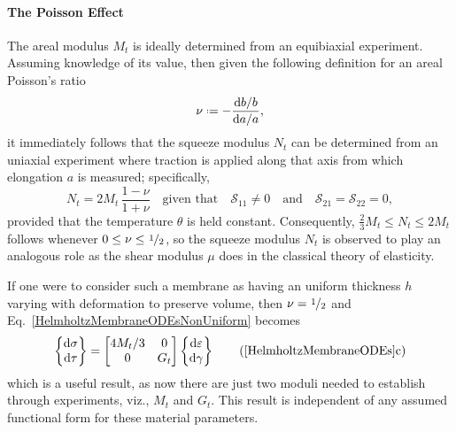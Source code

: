 \paragraph{The Poisson Effect}
\label{PoissonRatio}

The areal modulus $M_t$ is ideally determined from an equibiaxial experiment.  Assuming knowledge of its value, then given the following definition for an areal Poisson's ratio
\begin{displaymath}
\nu \defeq - \frac{\mathrm{d}b / b}{\mathrm{d}a / a} ,
\end{displaymath}
it immediately follows that the squeeze modulus $N_t$ can be determined from an uniaxial experiment where traction is applied along that axis from which elongation $a$ is measured; specifically,
\begin{displaymath}
N_t = 2M_t \, \frac{1 - \nu}{1 + \nu} 
\quad \text{given that} \quad
\mathcal{S}_{11} \neq 0 
\quad \text{and} \quad
\mathcal{S}_{21} = \mathcal{S}_{22} = 0 ,
\end{displaymath}
provided that the temperature $\theta$ is held constant.  Consequently, $\tfrac{2}{3} M_t \leq N_t \leq 2M_t$ follows whenever $0 \leq \nu \leq \textfrac{1}{2}$, so the squeeze modulus $N_t$ is observed to play an analogous role as the shear modulus $\mu$ does in the classical theory of elasticity.  

If one were to consider such a membrane as having an uniform thickness $h$ varying with deformation to preserve volume, then $\nu = \textfrac{1}{2}$ and Eq.~\ref{HelmholtzMembraneODEsNonUniform} becomes
\begin{equation}
\left\{ \begin{matrix}
\mathrm{d} \sigma \\ \mathrm{d} \tau
\end{matrix} \right\} = \begin{bmatrix}
4 M_t / 3 & 0 \\
0 & G_t
\end{bmatrix} \left\{ \begin{matrix}
\mathrm{d} \varepsilon \\ \mathrm{d} \gamma
\end{matrix} \right\}
\label{HelmholtzMembraneODEsNonUniformCV}
    \tag{\ref{HelmholtzMembraneODEs}c}
\end{equation}
which is a useful result, as now there are just two moduli needed to establish through experiments, viz., $M_t$ and $G_t$.  This result is independent of any assumed functional form for these material parameters.

